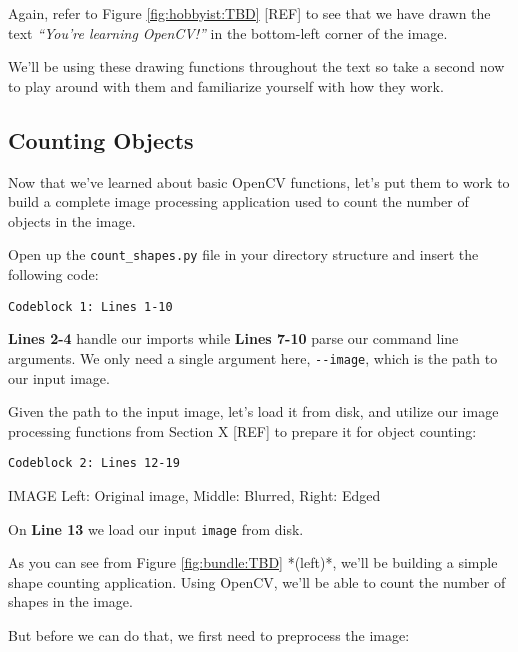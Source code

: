Again, refer to Figure \ref{fig:hobbyist:TBD} [REF] to see that we have drawn the text \textit{“You’re learning OpenCV!”} in the bottom-left corner of the image.

We’ll be using these drawing functions throughout the text so take a second now to play around with them and familiarize yourself with how they work.


\subsection{Counting Objects}\label{ch:hobbyist:opencv_basics:counting}

Now that we’ve learned about basic OpenCV functions, let’s put them to work to build a complete image processing application used to count the number of objects in the image.

Open up the \texttt{count_shapes.py} file in your directory structure and insert the following code:

\begin{verbatim}
Codeblock 1: Lines 1-10
\end{verbatim}

\textbf{Lines 2-4} handle our imports while \textbf{Lines 7-10} parse our command line arguments. We only need a single argument here, \texttt{-{}-image}, which is the path to our input image.

Given the path to the input image, let’s load it from disk, and utilize our image processing functions from Section X [REF] to prepare it for object counting:

\begin{verbatim}
Codeblock 2: Lines 12-19
\end{verbatim}

IMAGE Left: Original image, Middle: Blurred, Right: Edged

On \textbf{Line 13} we load our input \texttt{image} from disk.

As you can see from Figure \ref{fig:bundle:TBD} *(left)*, we’ll be building a simple shape counting application. Using OpenCV, we’ll be able to count the number of shapes in the image.

But before we can do that, we first need to preprocess the image:

